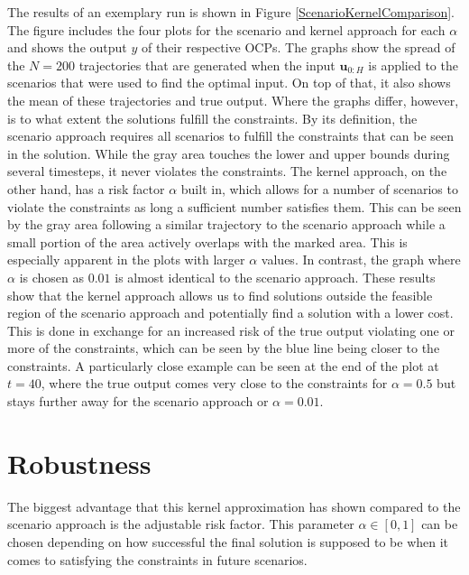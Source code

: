The results of an exemplary run is shown in Figure \ref{ScenarioKernelComparison}. The figure includes the four plots for the scenario and kernel approach for each $\alpha$ and shows the output $y$ of their respective OCPs. The graphs show the spread of the $N = 200$ trajectories that are generated when the input $\boldsymbol{u}_{0:H}$ is applied to the scenarios that were used to find the optimal input. On top of that, it also shows the mean of these trajectories and true output. Where the graphs differ, however, is to what extent the solutions fulfill the constraints. By its definition, the scenario approach requires all scenarios to fulfill the constraints that can be seen in the solution. While the gray area touches the lower and upper bounds during several timesteps, it never violates the constraints. The kernel approach, on the other hand, has a risk factor $\alpha$ built in, which allows for a number of scenarios to violate the constraints as long a sufficient number satisfies them. This can be seen by the gray area following a similar trajectory to the scenario approach while a small portion of the area actively overlaps with the marked area. This is especially apparent in the plots with larger $\alpha$ values. In contrast, the graph where $\alpha$ is chosen as $0.01$ is almost identical to the scenario approach. These results show that the kernel approach allows us to find solutions outside the feasible region of the scenario approach and potentially find a solution with a lower cost. This is done in exchange for an increased risk of the true output violating one or more of the constraints, which can be seen by the blue line being closer to the constraints. A particularly close example can be seen at the end of the plot at $t = 40$, where the true output comes very close to the constraints for $\alpha = 0.5$ but stays further away for the scenario approach or $\alpha = 0.01$.



\section{Robustness} \label{performance guarantees}

The biggest advantage that this kernel approximation has shown compared to the scenario approach is the adjustable risk factor. This parameter $\alpha \in [0, 1]$ can be chosen depending on how successful the final solution is supposed to be when it comes to satisfying the constraints in future scenarios. 

